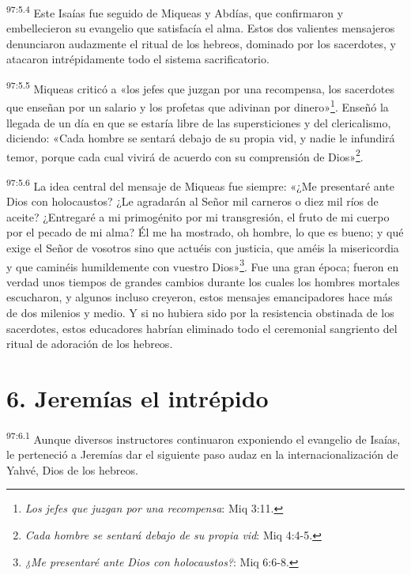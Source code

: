\par
\textsuperscript{97:5.4} Este Isaías fue seguido de Miqueas y Abdías, que confirmaron y embellecieron su evangelio que satisfacía el alma. Estos dos valientes mensajeros denunciaron audazmente el ritual de los hebreos, dominado por los sacerdotes, y atacaron intrépidamente todo el sistema sacrificatorio.

\par
\textsuperscript{97:5.5} Miqueas criticó a «los jefes que juzgan por una recompensa, los sacerdotes que enseñan por un salario y los profetas que adivinan por dinero»\footnote{\textit{Los jefes que juzgan por una recompensa}: Miq 3:11.}. Enseñó la llegada de un día en que se estaría libre de las supersticiones y del clericalismo, diciendo: «Cada hombre se sentará debajo de su propia vid, y nadie le infundirá temor, porque cada cual vivirá de acuerdo con su comprensión de Dios»\footnote{\textit{Cada hombre se sentará debajo de su propia vid}: Miq 4:4-5.}.

\par
\textsuperscript{97:5.6} La idea central del mensaje de Miqueas fue siempre: «¿Me presentaré ante Dios con holocaustos? ¿Le agradarán al Señor mil carneros o diez mil ríos de aceite? ¿Entregaré a mi primogénito por mi transgresión, el fruto de mi cuerpo por el pecado de mi alma? Él me ha mostrado, oh hombre, lo que es bueno; y qué exige el Señor de vosotros sino que actuéis con justicia, que améis la misericordia y que caminéis humildemente con vuestro Dios»\footnote{\textit{¿Me presentaré ante Dios con holocaustos?}: Miq 6:6-8.}. Fue una gran época; fueron en verdad unos tiempos de grandes cambios durante los cuales los hombres mortales escucharon, y algunos incluso creyeron, estos mensajes emancipadores hace más de dos milenios y medio. Y si no hubiera sido por la resistencia obstinada de los sacerdotes, estos educadores habrían eliminado todo el ceremonial sangriento del ritual de adoración de los hebreos.

\section*{6. Jeremías el intrépido}
\par
\textsuperscript{97:6.1} Aunque diversos instructores continuaron exponiendo el evangelio de Isaías, le perteneció a Jeremías dar el siguiente paso audaz en la internacionalización de Yahvé, Dios de los hebreos.

